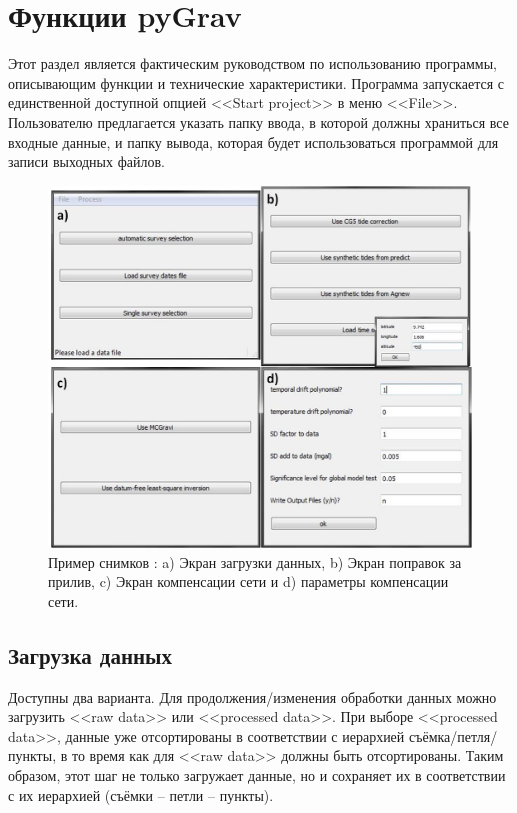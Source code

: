 \chapter[Функции pyGrav]{Функции pyGrav}
\label{chap:pygrav_functions}

Этот раздел является фактическим руководством по использованию программы,
описывающим функции и технические характеристики. Программа запускается с
единственной доступной опцией <<Start project>> в меню <<File>>. Пользователю
предлагается указать папку ввода, в которой должны храниться все входные данные,
и папку вывода, которая будет использоваться программой для записи выходных
файлов.

\begin{figure}[h]
    \includegraphics[width=\textwidth]{figures/example_of_pygrav_snapshots}
    \caption{Пример снимков \pg{}: a) Экран загрузки данных, b) Экран поправок
    за прилив, c) Экран компенсации сети и d) параметры компенсации сети.}
    \label{fig:example_of_pygrav_snapshots}
\end{figure}

\section[Загрузка данных]{Загрузка данных}
\label{sec:loading_data}

Доступны два варианта. Для продолжения/изменения обработки данных можно
загрузить <<raw data>> или <<processed data>>. При выборе <<processed data>>,
данные уже отсортированы в соответствии с иерархией съёмка/петля/пункты, в то
время как для <<raw data>> должны быть отсортированы. Таким образом, этот шаг не
только загружает данные, но и сохраняет их в соответствии с их иерархией (съёмки
-- петли -- пункты).

